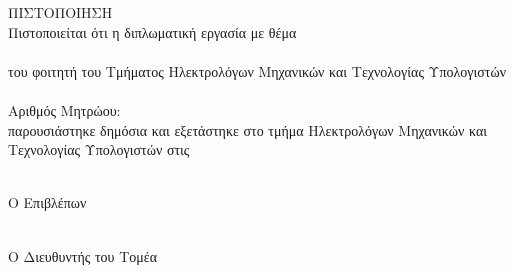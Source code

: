 \pagestyle{empty}
\begin{center}
{\LARGE ΠΙΣΤΟΠΟΙΗΣΗ\\[1cm]}
\large Πιστοποιείται ότι η διπλωματική εργασία με θέμα\\[1cm]
\textbf{\large \doctitle }\\[1cm]
του φοιτητή του Τμήματος Ηλεκτρολόγων Μηχανικών και Τεχνολογίας Υπολογιστών\\[1.5cm]
\me \\[0.5cm]
Αριθμός Μητρώου: \studnum \\[1.5cm]
παρουσιάστηκε δημόσια και εξετάστηκε στο τμήμα  Ηλεκτρολόγων Μηχανικών και Τεχνολογίας Υπολογιστών στις\\[0.5cm]
\\[2.5cm]
\end{center}
\begin{minipage}{0.5\textwidth}
\begin{flushleft} \large
Ο Επιβλέπων\\[0.5cm]
\supname \\
\emph{\suptitle}
\end{flushleft}
\end{minipage}
\begin{minipage}{0.5\textwidth}
\begin{flushright} \large
Ο Διευθυντής του Τομέα\\[0.5cm]
\headofdivision\\
\emph{\headofdivisiontitle}
\end{flushright}
\end{minipage}\\
\begin{minipage}{\textwidth}
\begin{flushleft} \large
\vfill\null
\vfill\null
\vfill\null
\vfill\null
\end{flushleft}
\end{minipage}
